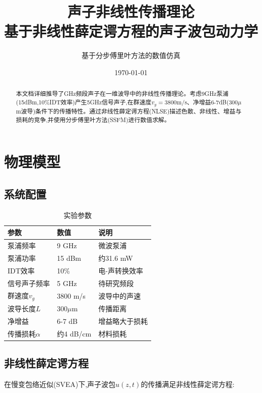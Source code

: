 \documentclass[12pt,a4paper]{article}
\title{\textbf{声子非线性传播理论}\\[0.5em]
\large 基于非线性薛定谔方程的声子波包动力学}
\author{基于分步傅里叶方法的数值仿真}
\date{\today}
\theoremstyle{definition}
\begin{document}
\maketitle

\begin{abstract}
本文档详细推导了GHz频段声子在一维波导中的非线性传播理论。考虑9GHz泵浦(15dBm,10\%IDT效率)产生5GHz信号声子,在群速度$v_g=3800$m/s、净增益6-7dB(300$\mu$m波导)条件下的传播特性。通过非线性薛定谔方程(NLSE)描述色散、非线性、增益与损耗的竞争,并使用分步傅里叶方法(SSFM)进行数值求解。
\end{abstract}

\tableofcontents
\newpage

\section{物理模型}

\subsection{系统配置}

\begin{table}[h]
\centering
\caption{实验参数}
\begin{tabular}{lll}
\toprule
参数 & 数值 & 说明 \\
\midrule
泵浦频率 & 9 GHz & 微波泵浦 \\
泵浦功率 & 15 dBm & 约31.6 mW \\
IDT效率 & 10\% & 电-声转换效率 \\
信号声子频率 & 5 GHz & 待研究频段 \\
群速度$v_g$ & 3800 m/s & 波导中的声速 \\
波导长度$L$ & 300$\mu$m & 传播距离 \\
净增益 & 6-7 dB & 增益略大于损耗 \\
传播损耗$\alpha$ & 约4 dB/cm & 材料损耗 \\
\bottomrule
\end{tabular}
\end{table}

\subsection{非线性薛定谔方程}

在慢变包络近似(SVEA)下,声子波包$u(z,t)$的传播满足非线性薛定谔方程:
\end{document}
